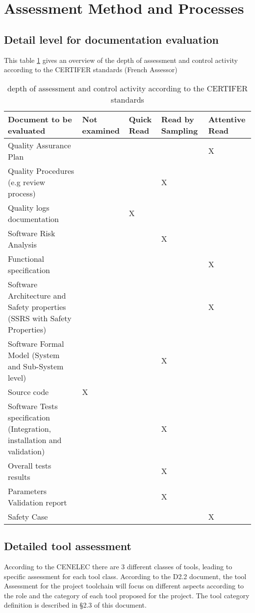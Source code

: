 \documentclass[openetcs]{template/openetcs_article}
\begin{document}
\newpage
\section{Assessment Method and Processes}

\subsection{Detail level for documentation evaluation}

This table \ref{table:depthofassessment} gives an overview of the depth of assessment and control activity according to the CERTIFER standards (French Assessor)

\begin{table}
\begin{tabular}{p{5cm}|>{\centering\arraybackslash}p{2cm}|>{\centering\arraybackslash}p{2cm}|
	>{\centering\arraybackslash}p{2cm}|>{\centering\arraybackslash}p{2cm}|} 
\hline
\textbf{Document to be evaluated} & \textbf{Not examined} & \textbf{Quick Read} & \textbf{Read by Sampling} & \textbf{Attentive Read} \\ \hline
Quality Assurance Plan & & & & X \\ \hline
Quality Procedures (e.g review process) & & & X & \\ \hline
Quality logs documentation & & X & & \\ \hline
Software Risk Analysis & & & X & \\ \hline
Functional specification & & & & X \\ \hline
Software Architecture and Safety properties (SSRS with Safety Properties) & & & & X \\ \hline
Software Formal Model (System and Sub-System level) & & & X & \\ \hline
Source code & X & & & \\ \hline
Software Tests specification (Integration, installation and validation) & & & X & \\ \hline
Overall tests results & & & X & \\ \hline
Parameters Validation report & & & X & \\ \hline
Safety Case & & & & X \\ \hline
\end{tabular}
\caption{depth of assessment and control activity according to the CERTIFER standards}
\label{table:depthofassessment}
\end{table}


\subsection{Detailed tool assessment}
According to the CENELEC there are 3 different classes of tools, leading to specific assessment for each tool class. According to the D2.2 document, the tool
Assessment for the project toolchain will focus on different aspects according to the role and the category of each tool proposed for the project. The tool
category definition is described in \S 2.3 of this document.
\end{document}
